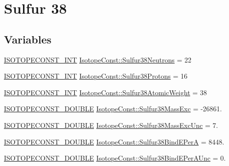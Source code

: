 \hypertarget{group___isotope_const-_sulfur-_s38}{}\section{Sulfur 38}
\label{group___isotope_const-_sulfur-_s38}
\subsection*{Variables}
\begin{DoxyCompactItemize}
\item 
\mbox{\hyperlink{group___isotope_const-_macros_ga5f18360b3e99483a35c32d789e62621c}{I\+S\+O\+T\+O\+P\+E\+C\+O\+N\+S\+T\+\_\+\+I\+NT}} \mbox{\hyperlink{group___isotope_const-_sulfur-_s38_ga2284f22c6bdb458987d37fc4c6e631b7}{Isotope\+Const\+::\+Sulfur38\+Neutrons}} = 22
\item 
\mbox{\hyperlink{group___isotope_const-_macros_ga5f18360b3e99483a35c32d789e62621c}{I\+S\+O\+T\+O\+P\+E\+C\+O\+N\+S\+T\+\_\+\+I\+NT}} \mbox{\hyperlink{group___isotope_const-_sulfur-_s38_gabca8a5a7d85157b99fdb560c899cc767}{Isotope\+Const\+::\+Sulfur38\+Protons}} = 16
\item 
\mbox{\hyperlink{group___isotope_const-_macros_ga5f18360b3e99483a35c32d789e62621c}{I\+S\+O\+T\+O\+P\+E\+C\+O\+N\+S\+T\+\_\+\+I\+NT}} \mbox{\hyperlink{group___isotope_const-_sulfur-_s38_ga3e41ac82b47adba85cd22fdbf1f029d5}{Isotope\+Const\+::\+Sulfur38\+Atomic\+Weight}} = 38
\item 
\mbox{\hyperlink{group___isotope_const-_macros_ga8f45a7272ce02c0b4c65c44636ed719a}{I\+S\+O\+T\+O\+P\+E\+C\+O\+N\+S\+T\+\_\+\+D\+O\+U\+B\+LE}} \mbox{\hyperlink{group___isotope_const-_sulfur-_s38_gaad4367e0f764d799797c7dcd50d7de85}{Isotope\+Const\+::\+Sulfur38\+Mass\+Exc}} = -\/26861.
\item 
\mbox{\hyperlink{group___isotope_const-_macros_ga8f45a7272ce02c0b4c65c44636ed719a}{I\+S\+O\+T\+O\+P\+E\+C\+O\+N\+S\+T\+\_\+\+D\+O\+U\+B\+LE}} \mbox{\hyperlink{group___isotope_const-_sulfur-_s38_gac279fbe5327f125ebcb9ca6a23a2a57e}{Isotope\+Const\+::\+Sulfur38\+Mass\+Exc\+Unc}} = 7.
\item 
\mbox{\hyperlink{group___isotope_const-_macros_ga8f45a7272ce02c0b4c65c44636ed719a}{I\+S\+O\+T\+O\+P\+E\+C\+O\+N\+S\+T\+\_\+\+D\+O\+U\+B\+LE}} \mbox{\hyperlink{group___isotope_const-_sulfur-_s38_gaad874efea7e83d33f5993488dbb85d47}{Isotope\+Const\+::\+Sulfur38\+Bind\+E\+PerA}} = 8448.
\item 
\mbox{\hyperlink{group___isotope_const-_macros_ga8f45a7272ce02c0b4c65c44636ed719a}{I\+S\+O\+T\+O\+P\+E\+C\+O\+N\+S\+T\+\_\+\+D\+O\+U\+B\+LE}} \mbox{\hyperlink{group___isotope_const-_sulfur-_s38_gab4502d922f7dd9b178052e03d669e455}{Isotope\+Const\+::\+Sulfur38\+Bind\+E\+Per\+A\+Unc}} = 0.

\end{DoxyCompactItemize}

